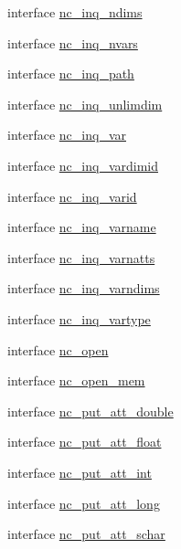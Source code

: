 \begin{DoxyCompactItemize}
\item 
interface \hyperlink{interfacenetcdf__nc__interfaces_1_1nc__inq__ndims}{nc\+\_\+inq\+\_\+ndims}
\item 
interface \hyperlink{interfacenetcdf__nc__interfaces_1_1nc__inq__nvars}{nc\+\_\+inq\+\_\+nvars}
\item 
interface \hyperlink{interfacenetcdf__nc__interfaces_1_1nc__inq__path}{nc\+\_\+inq\+\_\+path}
\item 
interface \hyperlink{interfacenetcdf__nc__interfaces_1_1nc__inq__unlimdim}{nc\+\_\+inq\+\_\+unlimdim}
\item 
interface \hyperlink{interfacenetcdf__nc__interfaces_1_1nc__inq__var}{nc\+\_\+inq\+\_\+var}
\item 
interface \hyperlink{interfacenetcdf__nc__interfaces_1_1nc__inq__vardimid}{nc\+\_\+inq\+\_\+vardimid}
\item 
interface \hyperlink{interfacenetcdf__nc__interfaces_1_1nc__inq__varid}{nc\+\_\+inq\+\_\+varid}
\item 
interface \hyperlink{interfacenetcdf__nc__interfaces_1_1nc__inq__varname}{nc\+\_\+inq\+\_\+varname}
\item 
interface \hyperlink{interfacenetcdf__nc__interfaces_1_1nc__inq__varnatts}{nc\+\_\+inq\+\_\+varnatts}
\item 
interface \hyperlink{interfacenetcdf__nc__interfaces_1_1nc__inq__varndims}{nc\+\_\+inq\+\_\+varndims}
\item 
interface \hyperlink{interfacenetcdf__nc__interfaces_1_1nc__inq__vartype}{nc\+\_\+inq\+\_\+vartype}
\item 
interface \hyperlink{interfacenetcdf__nc__interfaces_1_1nc__open}{nc\+\_\+open}
\item 
interface \hyperlink{interfacenetcdf__nc__interfaces_1_1nc__open__mem}{nc\+\_\+open\+\_\+mem}
\item 
interface \hyperlink{interfacenetcdf__nc__interfaces_1_1nc__put__att__double}{nc\+\_\+put\+\_\+att\+\_\+double}
\item 
interface \hyperlink{interfacenetcdf__nc__interfaces_1_1nc__put__att__float}{nc\+\_\+put\+\_\+att\+\_\+float}
\item 
interface \hyperlink{interfacenetcdf__nc__interfaces_1_1nc__put__att__int}{nc\+\_\+put\+\_\+att\+\_\+int}
\item 
interface \hyperlink{interfacenetcdf__nc__interfaces_1_1nc__put__att__long}{nc\+\_\+put\+\_\+att\+\_\+long}
\item 
interface \hyperlink{interfacenetcdf__nc__interfaces_1_1nc__put__att__schar}{nc\+\_\+put\+\_\+att\+\_\+schar}

\end{DoxyCompactItemize}
